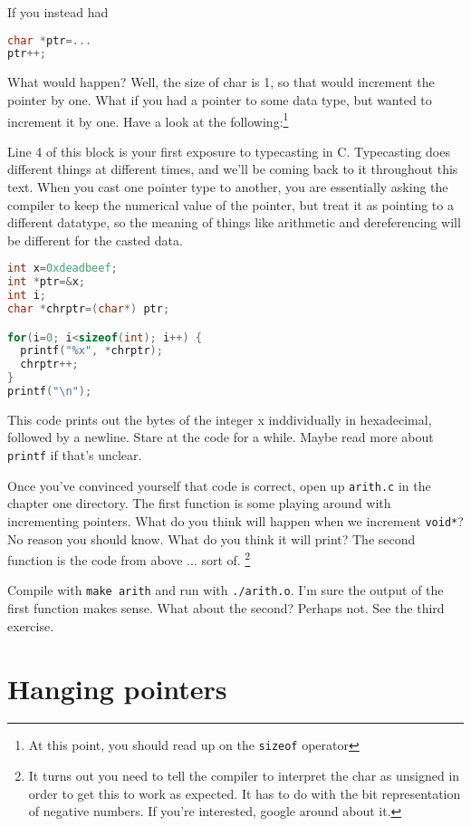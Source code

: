 \documentclass[ebook,11pt,oneside,openany]{memoir}
\begin{document}
If you instead had 

\begin{lstlisting}[language=C]
char *ptr=...
ptr++;
\end{lstlisting}

What would happen? Well, the size of char is 1, so that would increment the pointer by one. What if you had a pointer to some data type, but wanted to increment it by one. Have a look at the following:\footnote{At this point, you should read up on the \texttt{sizeof} operator}

Line 4 of this block is your first exposure to typecasting in C. Typecasting does different things at different times, and we'll be coming back to it throughout this text. When you cast one pointer type to another, you are essentially asking the compiler to keep the numerical value of the pointer, but treat it as pointing to a different datatype, so the meaning of things like arithmetic and dereferencing will be different for the casted data.

\begin{lstlisting}[language=C]
int x=0xdeadbeef;
int *ptr=&x;
int i;
char *chrptr=(char*) ptr;

for(i=0; i<sizeof(int); i++) {
  printf("%x", *chrptr);
  chrptr++;
}
printf("\n");
\end{lstlisting}


This code prints out the bytes of the integer x inddividually in hexadecimal, followed by a newline.  Stare at the code for a while. Maybe read more about \texttt{printf} if that's unclear.

Once you've convinced yourself that code is correct, open up \texttt{arith.c} in the chapter one directory. The first function is some playing around with incrementing pointers. What do you think will happen when we increment \texttt{void*}? No reason you should know. What do you think it will print? The second function is the code from above ... sort of. \footnote{It turns out you need to tell the compiler to interpret the char as unsigned in order to get this to work as expected. It has to do with the bit representation of negative numbers. If you're interested, google around about it.}

Compile with \texttt{make arith} and run with \texttt{./arith.o}. I'm sure the output of the first function makes sense. What about the second? Perhaps not. See the third exercise.

\section{Hanging pointers}
\end{document}
